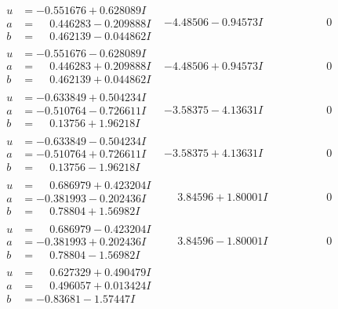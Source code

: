 \documentclass[1p]{elsarticle_modified}
\theoremstyle{definition}
\begin{document}
$$\begin{array}{c|c|c}
\begin{aligned}
u &= -0.551676 + 0.628089 I \\
a &= \phantom{-}0.446283 - 0.209888 I \\
b &= \phantom{-}0.462139 - 0.044862 I\end{aligned}
 & -4.48506 - 0.94573 I & \phantom{-0.000000 } 0 \\ \hline\begin{aligned}
u &= -0.551676 - 0.628089 I \\
a &= \phantom{-}0.446283 + 0.209888 I \\
b &= \phantom{-}0.462139 + 0.044862 I\end{aligned}
 & -4.48506 + 0.94573 I & \phantom{-0.000000 } 0 \\ \hline\begin{aligned}
u &= -0.633849 + 0.504234 I \\
a &= -0.510764 - 0.726611 I \\
b &= \phantom{-}0.13756 + 1.96218 I\end{aligned}
 & -3.58375 - 4.13631 I & \phantom{-0.000000 } 0 \\ \hline\begin{aligned}
u &= -0.633849 - 0.504234 I \\
a &= -0.510764 + 0.726611 I \\
b &= \phantom{-}0.13756 - 1.96218 I\end{aligned}
 & -3.58375 + 4.13631 I & \phantom{-0.000000 } 0 \\ \hline\begin{aligned}
u &= \phantom{-}0.686979 + 0.423204 I \\
a &= -0.381993 - 0.202436 I \\
b &= \phantom{-}0.78804 + 1.56982 I\end{aligned}
 & \phantom{-}3.84596 + 1.80001 I & \phantom{-0.000000 } 0 \\ \hline\begin{aligned}
u &= \phantom{-}0.686979 - 0.423204 I \\
a &= -0.381993 + 0.202436 I \\
b &= \phantom{-}0.78804 - 1.56982 I\end{aligned}
 & \phantom{-}3.84596 - 1.80001 I & \phantom{-0.000000 } 0 \\ \hline\begin{aligned}
u &= \phantom{-}0.627329 + 0.490479 I \\
a &= \phantom{-}0.496057 + 0.013424 I \\
b &= -0.83681 - 1.57447 I\end{aligned}

\end{array}$$
\end{document}
